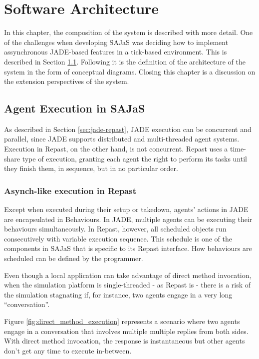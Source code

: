 \chapter{Software Architecture}
\label{chap:architecture}

In this chapter, the composition of the system is described with more detail. One of the challenges when developing SAJaS was deciding how to implement assynchronous JADE-based features in a tick-based environment. This is described in Section \ref{sec:agentexecution}. Following it is the definition of the architecture of the system in the form of conceptual diagrams. Closing this chapter is a discussion on the extension perspectives of the system.

\section{Agent Execution in SAJaS}
\label{sec:agentexecution}

As described in Section \ref{sec:jade-repast}, JADE execution can be concurrent and parallel, since JADE supports distributed and multi-threaded agent systems. Execution in Repast, on the other hand, is not concurrent. Repast uses a time-share type of execution, granting each agent the right to perform its tasks until they finish them, in sequence, but in no particular order.

\subsection{Asynch-like execution in Repast}
Except when executed during their setup or takedown, agents' actions in JADE are encapsulated in Behaviours. In JADE, multiple agents can be executing their behaviours simultaneously. In Repast, however, all scheduled objects run consecutively with variable execution sequence. This schedule is one of the components in SAJaS that is specific to its Repast interface. How behaviours are scheduled can be defined by the programmer.

Even though a local application can take advantage of direct method invocation, when the simulation platform is single-threaded - as Repast is - there is a risk of the simulation stagnating if, for instance, two agents engage in a very long ``conversation''.

Figure \ref{fig:direct_method_execution} represents a scenario where two agents engage in a conversation that involves multiple multiple replies from both sides. With direct method invocation, the response is instantaneous but other agents don't get any time to execute in-between.


